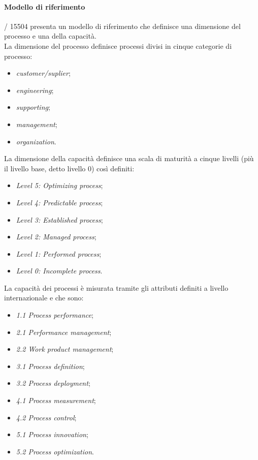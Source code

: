   \paragraph{Modello di riferimento}
  / 15504 presenta un modello di riferimento che definisce una dimensione del processo e una della capacità.\\
  La dimensione del processo definisce processi divisi in cinque categorie di processo:
  \begin{itemize}
    \item \emph{customer/suplier};
    \item \emph{engineering};
    \item \emph{supporting};
    \item \emph{management};
    \item \emph{organization}.
  \end{itemize}
  La dimensione della capacità definisce una scala di maturità a cinque livelli (più il livello base, detto livello 0) così definiti:
  \begin{itemize}
    \item \emph{Level 5: Optimizing process};
    \item \emph{Level 4: Predictable process};
    \item \emph{Level 3: Established process};
    \item \emph{Level 2: Managed process};
    \item \emph{Level 1: Performed process};
    \item \emph{Level 0: Incomplete process}.
  \end{itemize}
  La capacità dei processi è misurata tramite gli attributi definiti a livello internazionale e che sono:
  \begin{itemize}
    \item \emph{1.1 Process performance};
    \item \emph{2.1 Performance management};
    \item \emph{2.2 Work product management};
    \item \emph{3.1 Process definition};
    \item \emph{3.2 Process deployment};
    \item \emph{4.1 Process measurement};
    \item \emph{4.2 Process control};
    \item \emph{5.1 Process innovation};
    \item \emph{5.2 Process optimization}.
  \end{itemize}
